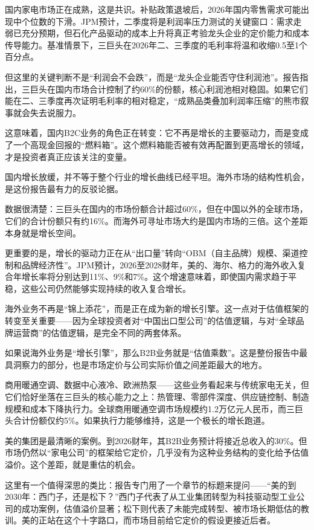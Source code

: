 \documentclass[11pt]{ctexart}
\begin{document}
国内家电市场正在成熟，这是共识。补贴政策退坡后，2026年国内零售需求可能出现中个位数的下滑。JPM预计，二季度将是利润率压力测试的关键窗口：需求走弱已充分预期，但石化产品驱动的成本上升将真正考验龙头企业的定价能力和成本传导能力。基准情景下，三巨头在2026年二、三季度的毛利率将温和收缩0.5至1个百分点。

但这里的关键判断不是“利润会不会跌”，而是“龙头企业能否守住利润池”。报告指出，三巨头在国内市场合计控制了约60\%的份额，核心利润池相对稳固。如果它们能在二、三季度再次证明毛利率的相对稳定，“成熟品类叠加利润率压缩”的熊市叙事就会失去说服力。

这意味着，国内B2C业务的角色正在转变：它不再是增长的主要驱动力，而是变成了一个高现金回报的“燃料箱”。这个燃料箱能否被有效再配置到更高增长的领域，才是投资者真正应该关注的变量。

国内增长放缓，并不等于整个行业的增长曲线已经平坦。海外市场的结构性机会，是这份报告最有力的反驳论据。

数据很清楚：三巨头在国内的市场份额合计超过60\%，但在中国以外的全球市场，它们的合计份额只有约16\%。而海外可寻址市场大约是国内市场的三倍。这个差距本身就是增长空间。

更重要的是，增长的驱动力正在从“出口量”转向“OBM（自主品牌）规模、渠道控制和品牌经济性”。JPM预计，2026至2028财年，美的、海尔、格力的海外收入复合年增长率将分别达到11\%、9\%和7\%。这个增速意味着，即使国内需求趋于平稳，这些公司仍然能够实现持续的收入复合增长。

海外业务不再是“锦上添花”，而是正在成为新的增长引擎。这一点对于估值框架的转变至关重要——因为全球投资者对“中国出口型公司”的估值逻辑，与对“全球品牌运营商”的估值逻辑，是完全不同的两套体系。

如果说海外业务是“增长引擎”，那么B2B业务就是“估值乘数”。这是整份报告中最具洞察力的部分，也是市场定价与公司实际价值之间差距最大的地方。

商用暖通空调、数据中心液冷、欧洲热泵——这些业务看起来与传统家电无关，但它们恰好坐落在三巨头的核心能力之上：热管理、零部件深度、供应链控制、制造规模和成本下降执行力。全球商用暖通空调市场规模约1.2万亿元人民币，而三巨头合计份额仅约5\%。如果执行力能够维持，这是一个极长的增长跑道。

美的集团是最清晰的案例。到2026财年，其B2B业务预计将接近总收入的30\%。但市场仍然以“家电公司”的框架给它定价，几乎没有为这种业务结构的变化给予估值溢价。这个差距，就是重估的机会。

这里有一个值得深思的类比：报告专门用了一个章节的标题来提问——“美的到2030年：西门子，还是松下？”西门子代表了从工业集团转型为科技驱动型工业公司的成功案例，估值溢价显著；松下则代表了未能完成转型、被市场长期低估的教训。美的正站在这个十字路口，而市场目前给它定价的假设更接近后者。
\end{document}
